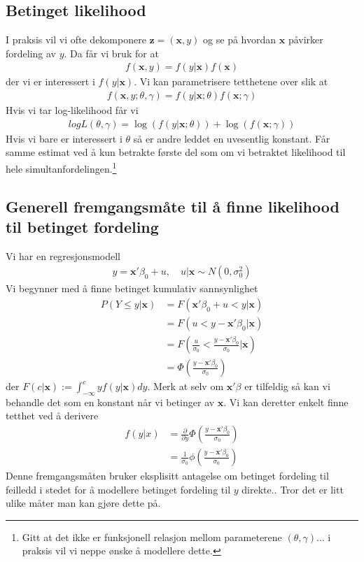 \subsection{Betinget likelihood}
I praksis vil vi ofte dekomponere $\mathbf{z}=(\mathbf{x},y)$ og se på hvordan $\mathbf{x}$ påvirker fordeling av $y$. Da får vi bruk for at 
\begin{align}
f(\mathbf{x},y) = f(y|\mathbf{x})f(\mathbf{x})
\end{align}
der vi er interessert i $f(y|\mathbf{x})$. Vi kan parametrisere tetthetene over slik at
\begin{align}
f(\mathbf{x},y;\theta,\gamma) = f(y|\mathbf{x};\theta)f(\mathbf{x};\gamma)
\end{align}
Hvis vi tar log-likelihood får vi 
\begin{align}
logL(\theta,\gamma) = \log(f(y|\mathbf{x};\theta))+\log(f(\mathbf{x};\gamma))
\end{align}
Hvis vi bare er interessert i $\theta$ så er andre leddet en uvesentlig konstant. Får samme estimat ved å kun betrakte første del som om vi betraktet likelihood til hele simultanfordelingen.\footnote{Gitt at det ikke er funksjonell relasjon mellom parameterene $(\theta,\gamma)$... i praksis vil vi neppe ønske å modellere dette.} 
\subsection{Generell fremgangsmåte til å finne likelihood til betinget fordeling}
Vi har en regresjonsmodell
\begin{align}
y=\mathbf{x}'\beta_0+u, \quad u|\mathbf{x}\sim N(0,\sigma_0^2)
\end{align}
Vi begynner med å finne betinget kumulativ sannsynlighet
\begin{align}
P(Y\leq y|\mathbf{x}) &= F(\mathbf{x}'\beta_0+u<y|\mathbf{x}) \\
&= F(u<y-\mathbf{x}'\beta_0|\mathbf{x}) \\
& = F\left(\frac{u}{\sigma_0}<\frac{y-\mathbf{x}'\beta_0}{\sigma_0}|\mathbf{x}\right) \\
&= \Phi\left(\frac{y-\mathbf{x}'\beta_0}{\sigma_0}\right)
\end{align}
der $F(c|\mathbf{x}):=\int_{-\infty}^c yf(y|\mathbf{x})dy$. Merk at selv om $\mathbf{x}'\beta$ er tilfeldig så kan vi behandle det som en konstant når vi betinger av $\mathbf{x}$. Vi kan deretter enkelt finne tetthet ved å derivere
\begin{align}
f(y|x) &= \frac{\partial}{\partial y}\Phi\left(\frac{y-\mathbf{x}'\beta_0}{\sigma_0}\right) \\
&= \frac{1}{\sigma_0}\phi\left(\frac{y-\mathbf{x}'\beta_0}{\sigma_0}\right)
\end{align}
Denne fremgangsmåten bruker eksplisitt antagelse om betinget fordeling til feilledd i stedet for å modellere betinget fordeling til $y$ direkte.. Tror det er litt ulike måter man kan gjøre dette på.
